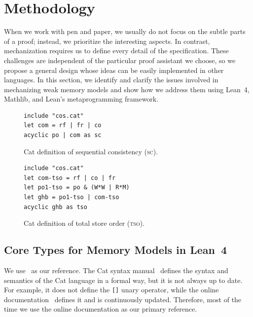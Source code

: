 \chapter{Methodology}
\label{chapter:design}

When we work with pen and paper, we usually do not focus on the subtle parts of a proof; instead, we prioritize the interesting aspects. In contrast, mechanization requires us to define every detail of the specification. These challenges are independent of the particular proof assistant we choose, so we propose a general design whose ideas can be easily implemented in other languages. In this section, we identify and clarify the issues involved in mechanizing weak memory models and show how we address them using Lean~4, Mathlib, and Lean's metaprogramming framework.

\begin{figure}[t]
  \centering
  \begin{minipage}{0.95\linewidth}
\begin{verbatim}
include "cos.cat"
let com = rf | fr | co
acyclic po | com as sc
\end{verbatim}
  \end{minipage}
  \caption{Cat definition of sequential consistency (\textsc{sc}).}
  \label{fig:cat-sc}
\end{figure}

\begin{figure}[t]
  \centering
  \begin{minipage}{0.95\linewidth}
\begin{verbatim}
include "cos.cat"
let com-tso = rf | co | fr
let po1-tso = po & (W*W | R*M)
let ghb = po1-tso | com-tso
acyclic ghb as tso
\end{verbatim}
  \end{minipage}
  \caption{Cat definition of total store order (\textsc{tso}).}
  \label{fig:cat-tso}
\end{figure}

\section{Core Types for Memory Models in Lean~4}
\label{sec:design:core-types}
We use~\citep{catOnlineDocHerd,catManualSyntax11} as our reference. The Cat syntax manual~\citep{catManualSyntax11} defines the syntax and semantics of the Cat language in a formal way, but it is not always up to date. For example, it does not define the \texttt{[]} unary operator, while the online documentation~\citep{catOnlineDocHerd} defines it and is continuously updated. Therefore, most of the time we use the online documentation as our primary reference.

